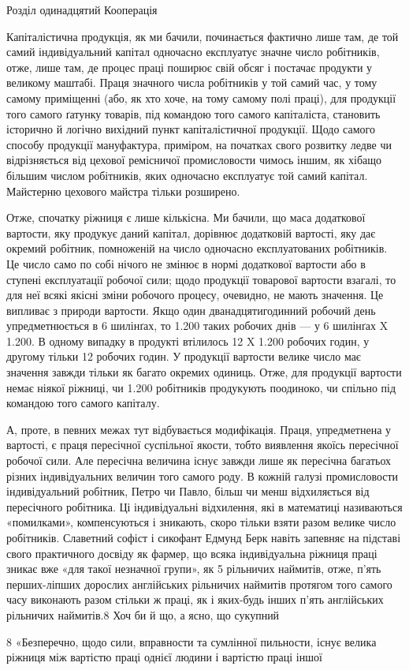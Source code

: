Розділ одинадцятий
Кооперація

Капіталістична продукція, як ми бачили, починається фактично
лише там, де той самий індивідуальний капітал одночасно експлуатує значне число робітників, отже,
лише там, де процес праці
поширює свій обсяг і постачає продукти у великому маштабі.
Праця значного числа робітників у той самий час, у тому самому
приміщенні (або, як хто хоче, на тому самому полі праці), для продукції того самого ґатунку товарів,
під командою того самого
капіталіста, становить історично й логічно вихідний пункт капіталістичної продукції. Щодо самого
способу продукції мануфактура, приміром, на початках свого розвитку ледве чи відрізняється від
цехової ремісничої промисловости чимось іншим, як
хібащо більшим числом робітників, яких одночасно експлуатує
той самий капітал. Майстерню цехового майстра тільки розширено.

Отже, спочатку ріжниця є лише кількісна. Ми бачили, що
маса додаткової вартости, яку продукує даний капітал, дорівнює
додатковій вартості, яку дає окремий робітник, помноженій на
число одночасно експлуатованих робітників. Це число само по
собі нічого не змінює в нормі додаткової вартости або в ступені
експлуатації робочої сили; щодо продукції товарової вартости
взагалі, то для неї всякі якісні зміни робочого процесу, очевидно,
не мають значення. Це випливає з природи вартости. Якщо один
дванадцятигодинний робочий день упредметнюється в 6 шилінґах, то 1.200 таких робочих днів — у 6
шилінґах X 1.200. В одному випадку в продукті втілилось 12 X 1.200 робочих годин, у другому тільки
12 робочих годин. У продукції вартости велике число
має значення завжди тільки як багато окремих одиниць. Отже, для
продукції вартости немає ніякої ріжниці, чи 1.200 робітників продукують поодиноко, чи спільно під
командою того самого капіталу.

А, проте, в певних межах тут відбувається модифікація. Праця,
упредметнена у вартості, є праця пересічної суспільної якости,
тобто виявлення якоїсь пересічної робочої сили. Але пересічна
величина існує завжди лише як пересічна багатьох різних індивідуальних величин того самого роду. В
кожній галузі промисловости індивідуальний робітник, Петро чи Павло, більш чи менш
відхиляється від пересічного робітника. Ці індивідуальні відхилення, які в математиці називаються
«помилками», компенсуються і зникають, скоро тільки взяти разом велике число робітників. Славетний
софіст і сикофант Едмунд Берк навіть запевняє
на підставі свого практичного досвіду як фармер, що всяка індивідуальна ріжниця праці зникає вже
«для такої незначної групи»,
як 5 рільничих наймитів, отже, п’ять перших-ліпших дорослих
англійських рільничих наймитів протягом того самого часу виконають разом стільки ж праці, як і
яких-будь інших п’ять англійських рільничих наймитів.8 Хоч би й що, а ясно, що сукупний

8 «Безперечно, щодо сили, вправности та сумлінної пильности, існує
велика ріжниця між вартістю праці однієї людини і вартістю праці іншої
